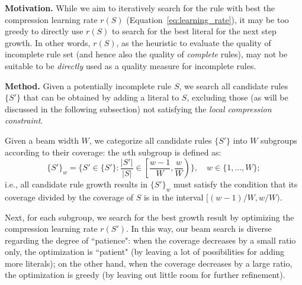 \noindent \textbf{Motivation.} While we aim to iteratively search for the rule with best the compression learning rate $r(S)$ (Equation~\ref{eq:learning_rate}), it may be too greedy to directly use $r(S)$ to search for the best literal for the next step growth. In other words, $r(S)$, as the heuristic to evaluate the quality of incomplete rule set (and hence also the quality of \emph{complete} rules), may not be suitable to be \emph{directly} used as a quality measure for incomplete rules. 

\noindent \textbf{Method.} Given a potentially incomplete rule $S$, we search all candidate rules $\{S'\}$ that can be obtained by adding a literal to $S$, excluding those (as will be discussed in the following subsection) not satisfying the \emph{local compression constraint}. 

Given a beam width $W$, we categorize all candidate rules $\{S'\}$ into $W$ subgroups according to their coverage: the $w$th subgroup is defined as: 
\begin{equation}
	\{S'\}_w = \{S' \in 	\{S'\}: \frac{|S'|}{|S|} \in \left[\frac{w-1}{W}, \frac{w}{W}\right) \}, \,\,\,\,\,\, w \in \{1, ..., W\}; 
\end{equation}
i.e., all candidate rule growth results in $\{S'\}_w$ must satisfy the condition that its coverage divided by the coverage of $S$ is in the interval $[(w-1)/W, w/W)$. 

Next, for each subgroup, we search for the best growth result by optimizing the compression learning rate $r(S')$. In this way, our beam search is diverse regarding the degree of ``patience": when the coverage decreases by a small ratio only, the optimization is ``patient" (by leaving a lot of possibilities for adding more literals); on the other hand, when the coverage decreases by a large ratio, the optimization is greedy (by leaving out little room for further refinement). 


